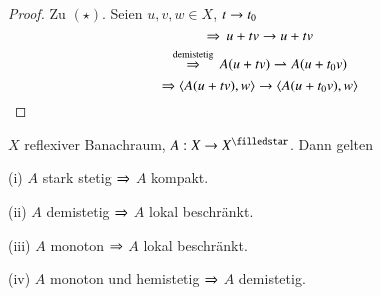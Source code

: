 \begin{proof}
    Zu $(\star)$. Seien $u,v,w\in X$, $t\rightarrow t_0$ 
    \[
        \Rightarrow\, u+tv \rightarrow u+tv
    \]
    \[
        \overset{\text{demistetig}}{\Rightarrow} \, A(u+tv) \rightharpoonup A(u+t_0v)
    \]
    \[
        \Rightarrow \langle A(u+tv),w\rangle\rightarrow \langle A(u+t_0v),w\rangle
    \]
\end{proof}

\begin{lem}\label{4.4}
    $X$ reflexiver Banachraum, $A:X\ra X^\star$. Dann gelten
    \begin{description}
        \item{(i)}
        $A$ stark stetig $\Rightarrow$ $A$ kompakt.
        \item{(ii)}
        $A$ demistetig $\Rightarrow$ $A$ lokal beschränkt.
        \item{(iii)}
        $A$ monoton $\Rightarrow$ $A$ lokal beschränkt.
        \item{(iv)}
        $A$ monoton und hemistetig $\Rightarrow$ $A$ demistetig.
    \end{description}
\end{lem}

